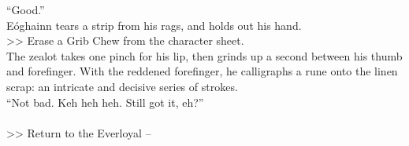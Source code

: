 “Good.”\\

Eóghainn tears a strip from his rags, and holds out his hand.\\
>> Erase a Grib Chew from the character sheet.\\

The zealot takes one pinch for his lip, then grinds up a second between his thumb and forefinger. With the reddened forefinger, he calligraphs a rune onto the linen scrap: an intricate and decisive series of strokes.\\

“Not bad. Keh heh heh. Still got it, eh?”\\
\\

>> Return to the Everloyal -- 